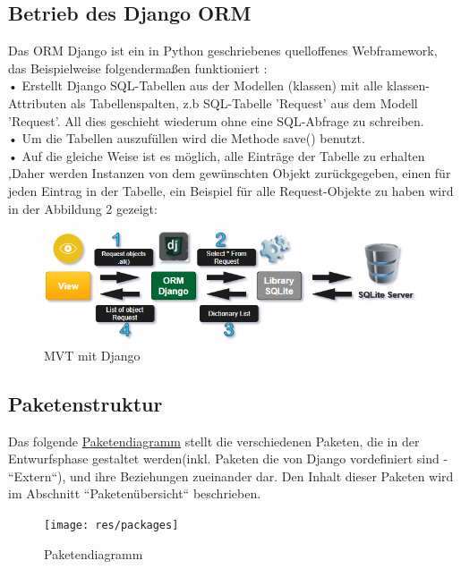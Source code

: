 \documentclass[parskip=full,11pt]{scrartcl}
\begin{document}
 \subsection{Betrieb des Django ORM} 
 
Das \gls{ORM} Django ist ein in Python geschriebenes quelloffenes Webframework, das Beispielweise folgendermaßen funktioniert :\\
 • Erstellt Django SQL-Tabellen aus der Modellen (klassen) mit alle klassen-Attributen als Tabellenspalten, z.b SQL-Tabelle 'Request' aus dem Modell 'Request'. All dies geschieht wiederum ohne eine SQL-Abfrage zu schreiben.\\
 • Um die Tabellen auszufüllen wird die Methode save() benutzt.\\
 • Auf die gleiche Weise ist es möglich, alle Einträge der Tabelle zu erhalten ,Daher werden Instanzen von dem gewünschten Objekt zurückgegeben, einen für jeden Eintrag in der Tabelle, ein Beispiel für alle Request-Objekte zu haben wird in der Abbildung 2 gezeigt:\\

  	\vspace{2cm}



\begin{figure}[ht!]
  	\includegraphics[width=1.05\textwidth]{res/MVTpart2.png}
  	 	\centering
  	    \caption{MVT mit Django}
 \end{figure}

 	

\newpage
 \subsection{Paketenstruktur}
 Das folgende \hyperref[packages]{Paketendiagramm} stellt die verschiedenen Paketen, die in der Entwurfsphase gestaltet werden(inkl. Paketen die von Django vordefiniert sind - ``Extern``), und ihre Beziehungen zueinander dar. Den Inhalt dieser Paketen wird im Abschnitt ``Paketenübersicht`` beschrieben.\\
 \begin{figure}[h]
 	\texttt{[image: res/packages]}
 	\centering
 	\caption{Paketendiagramm}
 	\label{packages}
 \end{figure}
 
\end{document}
